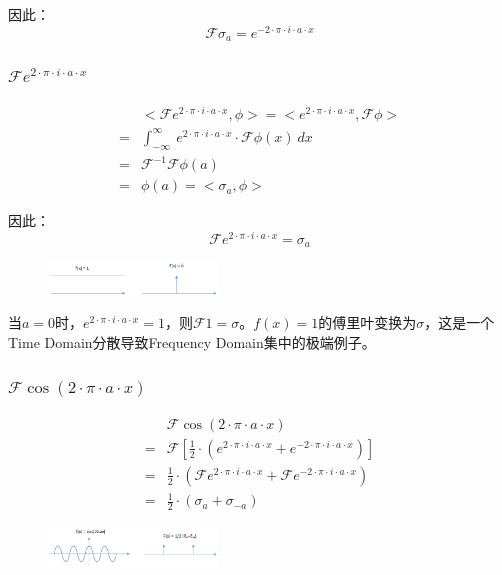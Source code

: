 因此：
\begin{equation}
	\mathcal{F}\sigma_a=e^{-2\cdot \pi\cdot i\cdot a\cdot x}
\end{equation}

\subsubsection{$\mathcal{F}e^{2\cdot \pi\cdot i\cdot a\cdot x}$}
\begin{align*}
	  & <\mathcal{F}e^{2\cdot \pi\cdot i\cdot a\cdot x},\phi>  =  <e^{2\cdot \pi\cdot i\cdot a\cdot x},\mathcal{F}\phi> \\
	= & \int_{-\infty}^{\infty}\ e^{2\cdot \pi\cdot i\cdot a\cdot x}\cdot \mathcal{F}\phi(x)\ dx                        \\
	= & \mathcal{F}^{-1}\mathcal{F}\phi(a)                                                                              \\
	= & \phi(a)= <\sigma_a,\phi>
\end{align*}

因此：
\begin{equation}
	\mathcal{F}e^{2\cdot \pi\cdot i\cdot a\cdot x}=\sigma_a
\end{equation}
\begin{figure}[H]
	\centering
	\includegraphics[width=0.4\textwidth]{assets/fe.png}
\end{figure}
当$a=0$时，$e^{2\cdot \pi\cdot i\cdot a\cdot x}=1$，则$\mathcal{F}1=\sigma$。$f(x)=1$的傅里叶变换为$\sigma$，这是一个Time Domain分散导致Frequency Domain集中的极端例子。
\subsubsection{$\mathcal{F}\cos(2\cdot\pi\cdot a\cdot x)$}
\begin{align*}
	  & \mathcal{F}\cos(2\cdot\pi\cdot a\cdot x)                                                                         \\
	= & \mathcal{F}[\frac{1}{2}\cdot(e^{2\cdot \pi\cdot i\cdot a\cdot x}+e^{-2\cdot \pi\cdot i\cdot a\cdot x})]          \\
	= & \frac{1}{2}\cdot(\mathcal{F}e^{2\cdot \pi\cdot i\cdot a\cdot x}+\mathcal{F}e^{-2\cdot \pi\cdot i\cdot a\cdot x}) \\
	= & \frac{1}{2}\cdot (\sigma_a+\sigma_{-a})
\end{align*}
\begin{figure}[H]
	\centering
	\includegraphics[width=0.4\textwidth]{assets/fcos.png}
\end{figure}
